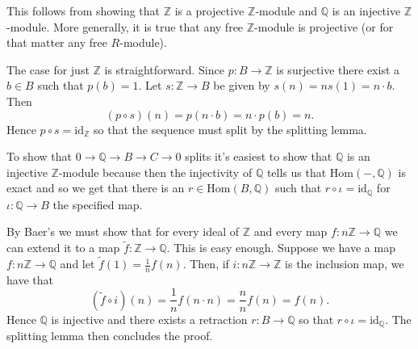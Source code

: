 \documentclass[a4paper]{article}
\begin{document}
\begin{exercise}{5}
  This follows from showing that $ \mathbb{Z} $ is a projective $ \mathbb{Z} $-module and $ \mathbb{Q} $ is an injective $ \mathbb{Z} $-module. More generally, it is true that any free $ \mathbb{Z} $-module is projective (or for that matter any free $ R $-module).

  The case for just $ \mathbb{Z} $ is straightforward. Since $ p:B \to \mathbb{Z} $ is surjective there exist a $ b \in B $ such that $ p(b) = 1$. Let $ s: \mathbb{Z} \to B $ be given by
  $ s(n) = ns(1)= n\cdot b $. Then
  \begin{equation*}
    (p\circ s)(n) = p(n\cdot b) = n \cdot p(b) = n
  .\end{equation*}
  Hence $ p \circ s = \text{id}_{\mathbb{Z}} $ so that the sequence must split by the splitting lemma.

  To show that $ 0 \to \mathbb{Q} \to B \to C \to 0 $ splits it's easiest to show that $ \mathbb{Q} $ is an injective $ \mathbb{Z} $-module because then the injectivity of $ \mathbb{Q} $ tells us that $ \text{Hom}(-, \mathbb{Q}) $ is exact and so we get that there is an $ r \in \text{Hom}(B, \mathbb{Q}) $ such that $ r \circ \iota = \text{id}_{\mathbb{Q}} $ for $ \iota: \mathbb{Q} \to B $ the specified map.

  By Baer's we must show that for every ideal of $ \mathbb{Z} $ and every map $ f: n\mathbb{Z} \to \mathbb{Q} $ we can extend it to a map $ \tilde{f}: \mathbb{Z} \to \mathbb{Q} $. This is easy enough. Suppose we have a map $ f: n\mathbb{Z} \to \mathbb{Q} $ and let $ \tilde{f}(1) = \frac{1}{n}f(n) $. Then, if $ i: n\mathbb{Z} \to \mathbb{Z} $ is the inclusion map, we have that $$ (\tilde{f}\circ i)(n) = \frac{1}{n}f(n \cdot n) = \frac{n}{n} f(n) = f(n). $$
  Hence $ \mathbb{Q} $ is injective and there exists a retraction $ r: B \to \mathbb{Q} $ so that $ r \circ \iota = \text{id}_{\mathbb{Q}} $. The splitting lemma then concludes the proof.
\end{exercise}
\end{document}
